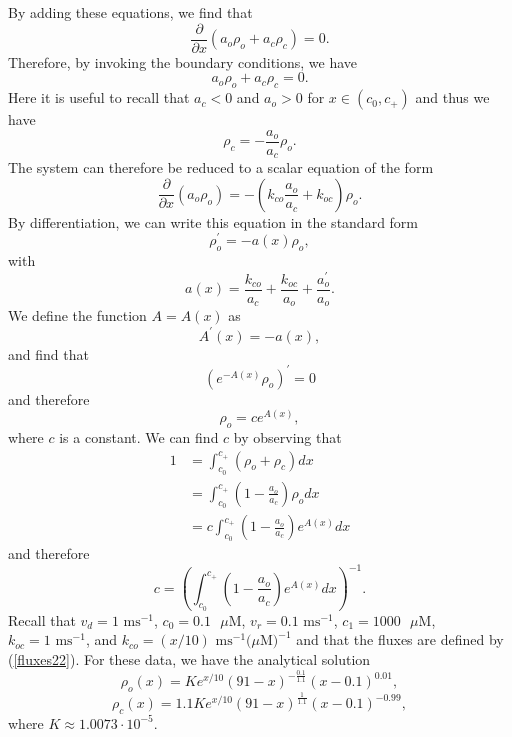 By adding these equations, we find that
\begin{equation}
\frac{\partial}{\partial x}\left(  a_{o}\rho_{o}+a_{c}\rho_{c}\right)  =0.
\end{equation}
Therefore, by invoking the boundary conditions, we have
\begin{equation}
a_{o}\rho_{o}+a_{c}\rho_{c}=0.
\end{equation}
Here it is useful to recall that $a_{c}<0$ and $a_{o}>0$ for $x\in\left(
c_{0},c_{+}\right)  $ and thus we have
\begin{equation}
\rho_{c}=-\frac{a_{o}}{a_{c}}\rho_{o}.
\end{equation}
The system can therefore be reduced to a scalar equation of the form
\begin{equation}
\frac{\partial}{\partial x}\left(  a_{o}\rho_{o}\right)  =-\left(  
k_{co}\frac{a_{o}}{a_{c}}+k_{oc}\right)  \rho_{o}. \label{reduced}
\end{equation}
By differentiation, we can write this equation in the standard form
\begin{equation}
\rho_{o}^{\prime}=-a(x)\rho_{o},
\end{equation}
with
\[
a(x)=\frac{k_{co}}{a_{c}}+\frac{k_{oc}}{a_{o}}+\frac{a_{o}^{\prime}}{a_{o}
}.
\]
We define the function $A=A(x)$ as
\[
A^{\prime}(x)=-a(x),
\]
and find that
\[
\left(  e^{-A(x)}\rho_{o}\right)  ^{\prime}=0
\]
and therefore
\[
\rho_{o}=ce^{A(x)},
\]
where $c$ is a constant. We can find $c$ by observing that
\begin{align*}
1 &  =\int_{c_{0}}^{c_{+}}\left(  \rho_{o}+\rho_{c}\right)  dx\\
&  =\int_{c_{0}}^{c_{+}}\left(  1-\frac{a_{o}}{a_{c}}\right)  \rho_{o}dx\\
&  =c\int_{c_{0}}^{c_{+}}\left(  1-\frac{a_{o}}{a_{c}}\right)  e^{A(x)}dx
\end{align*}
and therefore
\begin{equation}
c=\left(  \int_{c_{0}}^{c_{+}}\left(  1-\frac{a_{o}}{a_{c}}\right) 
e^{A(x)}dx\right)  ^{-1}.\label{c}
\end{equation}
Recall that $v_{d}=1\text{ ms}^{-1}$, $c_{0}=0.1\text{ }\mu \mathrm{{ M}}$,
$v_{r}=0.1\text{ ms}^{-1}$, $c_{1}=1000\text{ }\mu \mathrm{{ M}}$, $k_{oc}
=1\text{ ms}^{-1}$, and $k_{co}=(x/10)\text{ ms}^{-1} (\mu \mathrm{ M)^{-1}}$
 and that the fluxes are defined by (\ref{fluxes22}). 
For these data, we have the analytical solution
\[ \rho_o(x) = K e^{x/10} (91-x)^{-\frac{0.1}{1.1}} (x-0.1)^{0.01}, \]
\[ \rho_c(x)  = 1.1 K e^{x/10} (91-x)^{\frac{1}{1.1}} (x-0.1)^{-0.99}, \]
where $K \approx1.0073\cdot 10^{-5}$.

